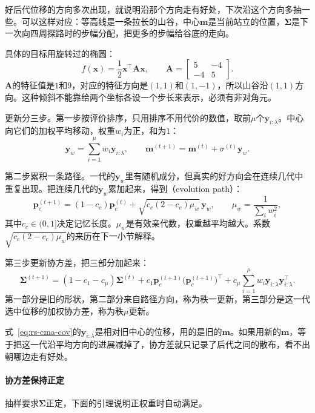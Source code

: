 好后代位移的方向多次出现，就说明沿那个方向走有好处，下次沿这个方向多抽一些。可以这样对应：等高线是一条拉长的山谷，中心$\bm{m}$是当前站立的位置，$\bm{\Sigma}$是下一次向四周探路时的步幅分配，把更多的步幅给谷底的走向。

具体的目标用旋转过的椭圆：
\begin{equation}
 f(\bm{x})=\frac12\bm{x}^\top\bm{A}\bm{x},\qquad
 \bm{A}=\begin{bmatrix}5&-4\\-4&5\end{bmatrix}.
 \label{eq:rs-rotated}
\end{equation}
$\bm{A}$的特征值是$1$和$9$，对应的特征方向是$(1,1)$和$(1,-1)$，所以山谷沿$(1,1)$方向。这种倾斜不能靠给两个坐标各设一个步长来表示，必须有非对角元。

更新分三步。第一步按评价排序，只用排序不用代价的数值，取前$\mu$个$\bm{y}_{i:\lambda}$。中心向它们的加权平均移动，权重$w_i$为正，和为$1$：
\begin{equation}
 \bm{y}_w=\sum_{i=1}^{\mu}w_i\bm{y}_{i:\lambda},\qquad
 \bm{m}^{(t+1)}=\bm{m}^{(t)}+\sigma^{(t)}\bm{y}_w.
 \label{eq:rs-cma-mean}
\end{equation}

第二步累积一条路径。一代的$\bm{y}_w$里有随机成分，但真实的好方向会在连续几代中重复出现。把连续几代的$\bm{y}_w$累加起来，得到（evolution path）：
\begin{equation}
 \bm{p}_c^{(t+1)}=(1-c_c)\bm{p}_c^{(t)}+\sqrt{c_c(2-c_c)\mu_w}\,\bm{y}_w,\qquad
 \mu_w=\frac{1}{\sum_iw_i^2},
 \label{eq:rs-cma-pc}
\end{equation}
其中$c_c\in(0,1]$决定记忆长度。$\mu_w$是有效亲代数，权重越平均越大。系数$\sqrt{c_c(2-c_c)\mu_w}$的来历在下一小节解释。

第三步更新协方差，把三部分加起来：
\begin{equation}
 \bm{\Sigma}^{(t+1)}=(1-c_1-c_\mu)\bm{\Sigma}^{(t)}
 +c_1\bm{p}_c^{(t+1)}\bigl(\bm{p}_c^{(t+1)}\bigr)^\top
 +c_\mu\sum_{i=1}^{\mu}w_i\bm{y}_{i:\lambda}\bm{y}_{i:\lambda}^\top.
 \label{eq:rs-cma-cov}
\end{equation}
第一部分是旧的形状，第二部分来自路径方向，称为秩一更新，第三部分是这一代选中位移的加权协方差，称为秩$\mu$更新。

式~\eqref{eq:rs-cma-cov}的$\bm{y}_{i:\lambda}$是相对旧中心的位移，用的是旧的$\bm{m}$。如果用新的$\bm{m}$，等于把这一代沿平均方向的进展减掉了，协方差就只记录了后代之间的散布，看不出朝哪边走有好处。

\paragraph{协方差保持正定}
抽样要求$\bm{\Sigma}$正定，下面的引理说明正权重时自动满足。

